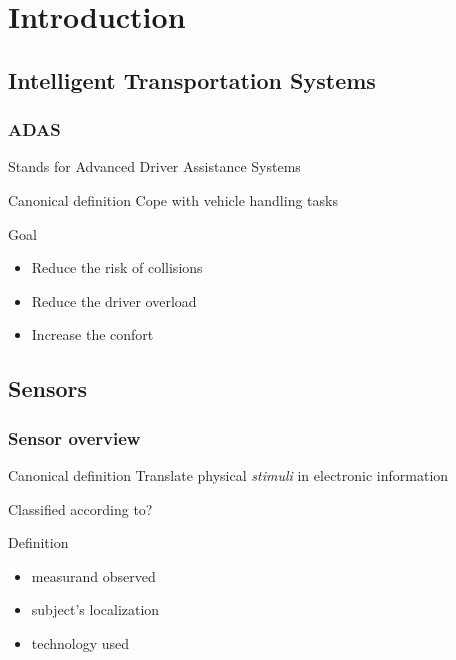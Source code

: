 \documentclass{beamer}
\begin{document}
\section{Introduction}

\subsection{Intelligent Transportation Systems}


	\begin{frame}
		\frametitle{ADAS}
		\begin{exampleblock}{Stands for}	
			Advanced Driver Assistance Systems		
		\end{exampleblock}				
		\begin{block}{Canonical definition}
			Cope with vehicle handling tasks
		\end{block}		

		\begin{block}{Goal}
			\begin{itemize}
			\item Reduce the risk of collisions
			\item Reduce the driver overload
			\item Increase the confort
			\end{itemize}
		\end{block}
		
	\end{frame}

\subsection{Sensors}

	\begin{frame}
		\frametitle{Sensor overview}
	
		\begin{block}{Canonical definition}
			Translate physical \textit{stimuli} in electronic information
		\end{block}
	
		Classified according to?	
		\begin{block}{Definition}
			\begin{itemize}
			\item measurand observed
			\item subject's localization
			\item technology used
			\end{itemize}
		\end{block}			
	
	\end{frame}
\end{document}
